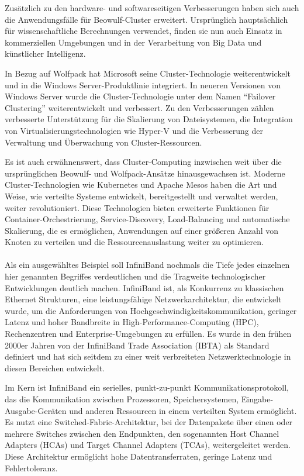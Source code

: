 Zusätzlich zu den hardware- und softwareseitigen Verbesserungen haben sich auch die Anwendungsfälle für Beowulf-Cluster erweitert. Ursprünglich hauptsächlich für wissenschaftliche Berechnungen verwendet, finden sie nun auch Einsatz in kommerziellen Umgebungen und in der Verarbeitung von Big Data und künstlicher Intelligenz.

In Bezug auf Wolfpack hat Microsoft seine Cluster-Technologie weiterentwickelt und in die Windows Server-Produktlinie integriert. In neueren Versionen von Windows Server wurde die Cluster-Technologie unter dem Namen \enquote{Failover Clustering} weiterentwickelt und verbessert. Zu den Verbesserungen zählen verbesserte Unterstützung für die Skalierung von Dateisystemen, die Integration von Virtualisierungstechnologien wie Hyper-V und die Verbesserung der Verwaltung und Überwachung von Cluster-Ressourcen.

Es ist auch erwähnenswert, dass Cluster-Computing inzwischen weit über die ursprünglichen Beowulf- und Wolfpack-Ansätze hinausgewachsen ist. Moderne Cluster-Technologien wie Kubernetes und Apache Mesos haben die Art und Weise, wie verteilte Systeme entwickelt, bereitgestellt und verwaltet werden, weiter revolutioniert. Diese Technologien bieten erweiterte Funktionen für Container-Orchestrierung, Service-Discovery, Load-Balancing und automatische Skalierung, die es ermöglichen, Anwendungen auf einer größeren Anzahl von Knoten zu verteilen und die Ressourcenauslastung weiter zu optimieren.
\\\\
Als ein ausgewähltes Beispiel soll InfiniBand nochmals die Tiefe jedes einzelnen hier genannten Begriffes verdeutlichen und die Tragweite technologischer Entwicklungen deutlich machen. InfiniBand ist, als Konkurrenz zu klassischen Ethernet Strukturen, eine leistungsfähige Netzwerkarchitektur, die entwickelt wurde, um die Anforderungen von Hochgeschwindigkeitskommunikation, geringer Latenz und hoher Bandbreite in High-Performance-Computing (HPC), Rechenzentren und Enterprise-Umgebungen zu erfüllen. Es wurde in den frühen 2000er Jahren von der InfiniBand Trade Association (IBTA) als Standard definiert und hat sich seitdem zu einer weit verbreiteten Netzwerktechnologie in diesen Bereichen entwickelt.

Im Kern ist InfiniBand ein serielles, punkt-zu-punkt Kommunikationsprotokoll, das die Kommunikation zwischen Prozessoren, Speichersystemen, Eingabe-Ausgabe-Geräten und anderen Ressourcen in einem verteilten System ermöglicht. Es nutzt eine Switched-Fabric-Architektur, bei der Datenpakete über einen oder mehrere Switches zwischen den Endpunkten, den sogenannten Host Channel Adapters (HCAs) und Target Channel Adapters (TCAs), weitergeleitet werden. Diese Architektur ermöglicht hohe Datentransferraten, geringe Latenz und Fehlertoleranz.

